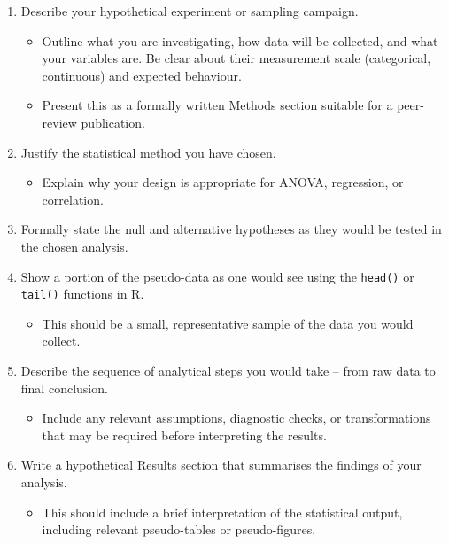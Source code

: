 \documentclass[
  10t,
]{article}
\providecommand{\tightlist}{%
  \setlength{\itemsep}{0pt}\setlength{\parskip}{0pt}}
\let\oldtexttt\texttt
\renewcommand{\texttt}[1]{\oldtexttt{\small #1}}
\begin{document}
\begin{enumerate}
\def\labelenumi{\arabic{enumi}.}
\tightlist
\item
  Describe your hypothetical experiment or sampling campaign.

  \begin{itemize}
  \tightlist
  \item
    Outline what you are investigating, how data will be collected, and
    what your variables are. Be clear about their measurement scale
    (categorical, continuous) and expected behaviour.
  \item
    Present this as a formally written Methods section suitable for a
    peer-review publication.
  \end{itemize}
\item
  Justify the statistical method you have chosen.

  \begin{itemize}
  \tightlist
  \item
    Explain why your design is appropriate for ANOVA, regression, or
    correlation.
  \end{itemize}
\item
  Formally state the null and alternative hypotheses as they would be
  tested in the chosen analysis.
\item
  Show a portion of the pseudo-data as one would see using the
  \texttt{head()} or \texttt{tail()} functions in R.

  \begin{itemize}
  \tightlist
  \item
    This should be a small, representative sample of the data you would
    collect.
  \end{itemize}
\item
  Describe the sequence of analytical steps you would take -- from raw
  data to final conclusion.

  \begin{itemize}
  \tightlist
  \item
    Include any relevant assumptions, diagnostic checks, or
    transformations that may be required before interpreting the
    results.
  \end{itemize}
\item
  Write a hypothetical Results section that summarises the findings of
  your analysis.

  \begin{itemize}
  \tightlist
  \item
    This should include a brief interpretation of the statistical
    output, including relevant pseudo-tables or pseudo-figures.
  \end{itemize}
\end{enumerate}
\end{document}

